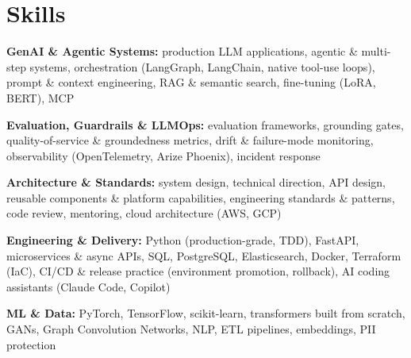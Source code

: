 \documentclass[10pt,a4paper]{article}
\begin{document}
\section{Skills}
\begin{tight}
  \item[\textcolor{accent}{\small$\bullet$}] \textbf{GenAI \& Agentic Systems:} production LLM applications, agentic \& multi-step systems, orchestration (LangGraph, LangChain, native tool-use loops), prompt \& context engineering, RAG \& semantic search, fine-tuning (LoRA, BERT), MCP
  \item[\textcolor{accent}{\small$\bullet$}] \textbf{Evaluation, Guardrails \& LLMOps:} evaluation frameworks, grounding gates, quality-of-service \& groundedness metrics, drift \& failure-mode monitoring, observability (OpenTelemetry, Arize Phoenix), incident response
  \item[\textcolor{accent}{\small$\bullet$}] \textbf{Architecture \& Standards:} system design, technical direction, API design, reusable components \& platform capabilities, engineering standards \& patterns, code review, mentoring, cloud architecture (AWS, GCP)
  \item[\textcolor{accent}{\small$\bullet$}] \textbf{Engineering \& Delivery:} Python (production-grade, TDD), FastAPI, microservices \& async APIs, SQL, PostgreSQL, Elasticsearch, Docker, Terraform (IaC), CI/CD \& release practice (environment promotion, rollback), AI coding assistants (Claude Code, Copilot)
  \item[\textcolor{accent}{\small$\bullet$}] \textbf{ML \& Data:} PyTorch, TensorFlow, scikit-learn, transformers built from scratch, GANs, Graph Convolution Networks, NLP, ETL pipelines, embeddings, PII protection
\end{tight}

\end{document}
